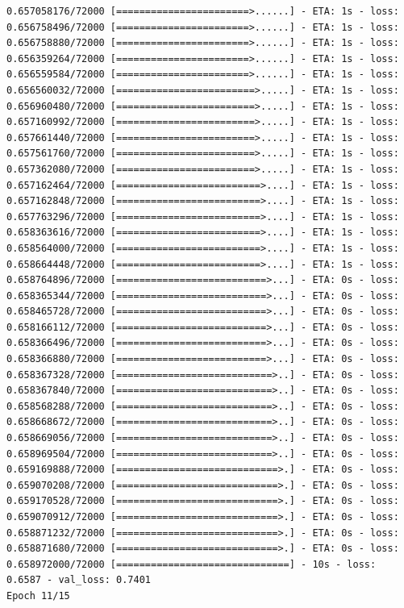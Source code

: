 \documentclass[12pt,fleqn]{article}\usepackage{../../common}
\begin{document}
\begin{verbatim}
0.657058176/72000 [=======================>......] - ETA: 1s - loss: 0.656758496/72000 [=======================>......] - ETA: 1s - loss: 0.656758880/72000 [=======================>......] - ETA: 1s - loss: 0.656359264/72000 [=======================>......] - ETA: 1s - loss: 0.656559584/72000 [=======================>......] - ETA: 1s - loss: 0.656560032/72000 [========================>.....] - ETA: 1s - loss: 0.656960480/72000 [========================>.....] - ETA: 1s - loss: 0.657160992/72000 [========================>.....] - ETA: 1s - loss: 0.657661440/72000 [========================>.....] - ETA: 1s - loss: 0.657561760/72000 [========================>.....] - ETA: 1s - loss: 0.657362080/72000 [========================>.....] - ETA: 1s - loss: 0.657162464/72000 [=========================>....] - ETA: 1s - loss: 0.657162848/72000 [=========================>....] - ETA: 1s - loss: 0.657763296/72000 [=========================>....] - ETA: 1s - loss: 0.658363616/72000 [=========================>....] - ETA: 1s - loss: 0.658564000/72000 [=========================>....] - ETA: 1s - loss: 0.658664448/72000 [=========================>....] - ETA: 1s - loss: 0.658764896/72000 [==========================>...] - ETA: 0s - loss: 0.658365344/72000 [==========================>...] - ETA: 0s - loss: 0.658465728/72000 [==========================>...] - ETA: 0s - loss: 0.658166112/72000 [==========================>...] - ETA: 0s - loss: 0.658366496/72000 [==========================>...] - ETA: 0s - loss: 0.658366880/72000 [==========================>...] - ETA: 0s - loss: 0.658367328/72000 [===========================>..] - ETA: 0s - loss: 0.658367840/72000 [===========================>..] - ETA: 0s - loss: 0.658568288/72000 [===========================>..] - ETA: 0s - loss: 0.658668672/72000 [===========================>..] - ETA: 0s - loss: 0.658669056/72000 [===========================>..] - ETA: 0s - loss: 0.658969504/72000 [===========================>..] - ETA: 0s - loss: 0.659169888/72000 [============================>.] - ETA: 0s - loss: 0.659070208/72000 [============================>.] - ETA: 0s - loss: 0.659170528/72000 [============================>.] - ETA: 0s - loss: 0.659070912/72000 [============================>.] - ETA: 0s - loss: 0.658871232/72000 [============================>.] - ETA: 0s - loss: 0.658871680/72000 [============================>.] - ETA: 0s - loss: 0.658972000/72000 [==============================] - 10s - loss: 0.6587 - val_loss: 0.7401
Epoch 11/15

\end{verbatim}
\end{document}
